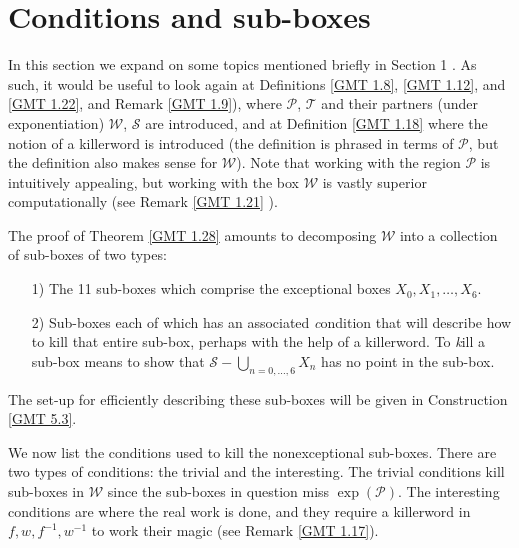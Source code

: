  
\chapter{Conditions and sub-boxes}
  
In this section we expand on some topics mentioned briefly in
Section 1 %
.  As such, it would be useful to look again at
Definitions \ref{GMT 1.8}, \ref{GMT 1.12}, and \ref{GMT 1.22}, and Remark \ref{GMT 1.9}),
where ${\mathcal P}$, ${\mathcal T}$ and their partners (under exponentiation)
${\mathcal W}$, ${\mathcal S}$ are introduced, and at
Definition \ref{GMT 1.18}
 where the notion of a killerword is introduced (the
definition is phrased in terms of ${\mathcal P}$, but the definition also makes sense for ${\mathcal W}$).  Note that working with
the region
${\mathcal P}$ is intuitively appealing, but working with the box ${\mathcal W}$ is vastly superior computationally (see
Remark \ref{GMT 1.21}
).

The proof of Theorem \ref{GMT 1.28} amounts to decomposing
 ${\mathcal W}$ into a collection of sub-boxes of two types:
\begin{itemize}
\item[1)]   The 11 sub-boxes which comprise the 
exceptional boxes $X_0, X_1, \ldots, X_6.$ 

\item[2)]   Sub-boxes each of which has an associated {\textit condition} that will describe how to kill that entire sub-box,
perhaps with the help of a killerword.  To {\textit kill} a sub-box means to show that 
${\mathcal S} - \bigcup_{n = 0,\dots, 6} X_n$ has no point in the sub-box. 
\end{itemize}
\noindent The set-up for efficiently describing these sub-boxes will be given in Construction \ref{GMT 5.3}. 
 

We now list the conditions used to kill the nonexceptional sub-boxes.  There are two types of conditions: the trivial and
the interesting.  The trivial conditions kill sub-boxes in ${\mathcal W}$ since the sub-boxes in question miss 
$\exp({\mathcal P}).$  The interesting conditions are where the real work is done, and they require a killerword in $f, w,
f^{-1}, w^{-1}$ to work their magic (see
Remark \ref{GMT 1.17}).

